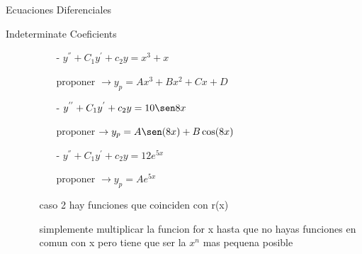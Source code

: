 \begin{section}{Ecuaciones Diferenciales}
\begin{subsection}{Indeterminate Coeficients}
\begin{enumerate}
\begin{enumerate}
						\begin{enumerate}
							\item[-] $y^{''} + C_1y^{'} + c_2y = x^3 + x$
		
								proponer $\rightarrow y_p = Ax^3 + Bx^2 + Cx + D$
							\item[-] $y^{''} + C_1y^{'} + c_2y = 10 \sen 8x$
		
								proponer $\rightarrow y_p = A \sen (8x) + B \cos (8x) $
							\item[-] $y^{''} + C_1y^{'} + c_2y = 12 e^{5x} $
		
								proponer $\rightarrow y_p = Ae^{5x}$
						\end{enumerate}
					\item[caso 2] hay funciones que coinciden con r(x)
		
						simplemente multiplicar la funcion for x hasta que no hayas funciones en comun con x
						pero tiene que ser la $x^n$ mas pequena posible
				\end{enumerate}
		
		\end{enumerate}

	\end{subsection}

\end{section}
	




